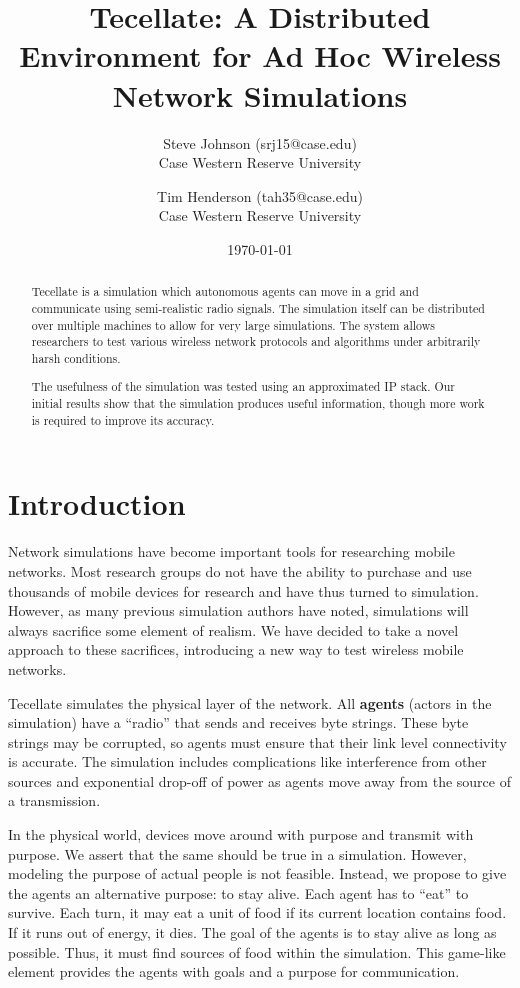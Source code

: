 \documentclass[12pt]{article}
\title{Tecellate: A Distributed Environment for Ad Hoc Wireless Network Simulations}
\author{
        Steve Johnson (srj15@case.edu)\\
        Case Western Reserve University\\
        \and Tim Henderson (tah35@case.edu)\\
        Case Western Reserve University
}
\date{\today}
\begin{document}
\doublespacing
\maketitle


\begin{abstract}
    Tecellate is a simulation which autonomous agents can move in a grid and communicate using
    semi-realistic radio signals. The simulation itself can be distributed over multiple machines to
    allow for very large simulations. The system allows researchers to test various wireless network
    protocols and algorithms under arbitrarily harsh conditions.
    
     The usefulness of the simulation was tested using an approximated IP stack. Our initial results
    show that the simulation produces useful information, though more work is required to improve
    its accuracy.
\end{abstract}

\section{Introduction}

Network simulations have become important tools for researching mobile networks. Most research
groups do not have the ability to purchase and use thousands of mobile devices for research and have
thus turned to simulation. However, as many previous simulation authors have noted, simulations will
always sacrifice some element of realism. We have decided to take a novel approach to these
sacrifices, introducing a new way to test wireless mobile networks.

Tecellate simulates the physical layer of the network. All \textbf{agents} (actors in the
simulation) have a ``radio'' that sends and receives byte strings. These byte strings may be
corrupted, so agents must ensure that their link level connectivity is accurate. The simulation
includes complications like interference from other sources and exponential drop-off of power as
agents move away from the source of a transmission.

In the physical world, devices move around with purpose and transmit with purpose. We assert that
the same should be true in a simulation. However, modeling the purpose of actual people is not
feasible. Instead, we propose to give the agents an alternative purpose: to stay alive. Each agent
has to ``eat'' to survive. Each turn, it may eat a unit of food if its current location contains
food. If it runs out of energy, it dies. The goal of the agents is to stay alive as long as
possible. Thus, it must find sources of food within the simulation. This game-like element provides
the agents with goals and a purpose for communication.
\end{document}
